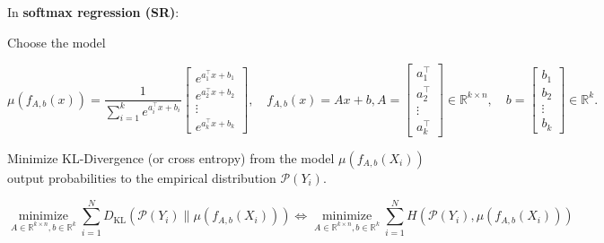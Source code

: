 \begin{definition}
    In \textbf{softmax regression (SR)}:

    Choose the model

    $$
    \mu\left(f_{A, b}(x)\right)=\frac{1}{\sum_{i=1}^{k} e^{a_{i}^{\top} x+b_{i}}}\left[\begin{array}{c}
    e^{a_{1}^{\top} x+b_{1}} \\
    e^{a_{2}^{\top} x+b_{2}} \\
    \vdots \\
    e^{a_{k}^{\top} x+b_{k}}
    \end{array}\right], \quad f_{A, b}(x)=A x+b, A=\left[\begin{array}{c}
    a_{1}^{\top} \\
    a_{2}^{\top} \\
    \vdots \\
    a_{k}^{\top}
    \end{array}\right] \in \mathbb{R}^{k \times n}, \quad b=\left[\begin{array}{c}
    b_{1} \\
    b_{2} \\
    \vdots \\
    b_{k}
    \end{array}\right] \in \mathbb{R}^{k} .
    $$

    Minimize KL-Divergence (or cross entropy) from the model $\mu\left(f_{A, b}\left(X_{i}\right)\right)$ output probabilities to the empirical distribution $\mathcal{P}\left(Y_{i}\right)$.

    $$
    \underset{A \in \mathbb{R}^{k \times n}, b \in \mathbb{R}^{k}}{\operatorname{minimize}} \sum_{i=1}^{N} D_{\mathrm{KL}}\left(\mathcal{P}\left(Y_{i}\right) \| \mu\left(f_{A, b}\left(X_{i}\right)\right)\right) \Longleftrightarrow \underset{A \in \mathbb{R}^{k \times n}, b \in \mathbb{R}^{k}}{\operatorname{minimize}} \sum_{i=1}^{N} H\left(\mathcal{P}\left(Y_{i}\right), \mu\left(f_{A, b}\left(X_{i}\right)\right)\right)
    $$
\end{definition}

